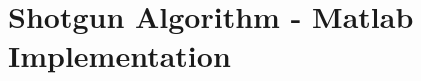 \documentclass[a4paper,11pt]{article}
\begin{document}
\section{Shotgun Algorithm - Matlab Implementation}\label{shotgun-mat}


\end{document}
